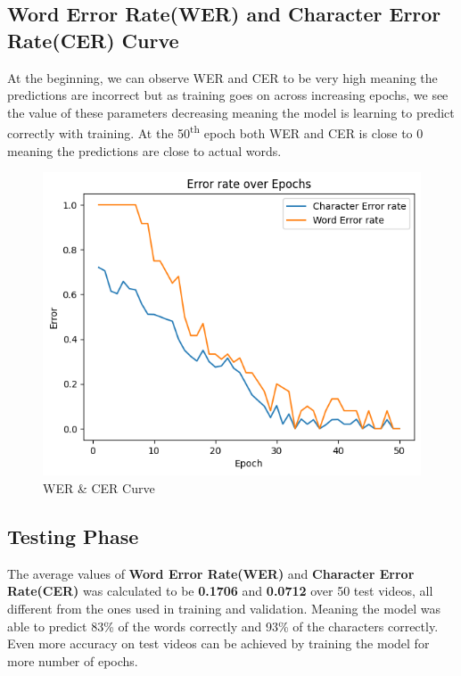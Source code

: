        \subsection{Word Error Rate(WER) and Character Error Rate(CER) Curve}
       At the beginning, we can observe WER and CER to be very high meaning the predictions are incorrect but as training goes on across increasing epochs, we see the value of these parameters decreasing meaning the model is learning to predict correctly with training. At the 50\textsuperscript{th} epoch both WER and CER is close to 0 meaning the predictions are close to actual words.
       \begin{figure}[h]
           \centering
           \includegraphics[width=0.8\linewidth]{img/wer.png}
           \caption{WER \& CER Curve}
           \label{fig:enter-label}
       \end{figure}
       \subsection{Testing Phase}
       The average values of \textbf{Word Error Rate(WER)} and \textbf{Character Error Rate(CER)} was calculated to be \textbf{0.1706} and \textbf{0.0712} over 50 test videos, all different from the ones used in training and validation. Meaning the model was able to predict 83\% of the words correctly and 93\% of the characters correctly. Even more accuracy on test videos can be achieved by training the model for more number of epochs.